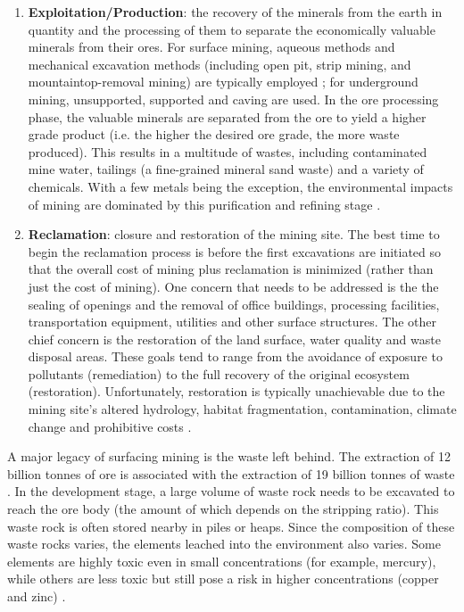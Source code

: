 \documentclass{article}
\begin{document}
\begin{enumerate}
    \item \textbf{Exploitation/Production}: the recovery of the minerals from the earth in quantity and the processing of them to separate the economically valuable minerals from their ores. For surface mining, aqueous methods and mechanical excavation methods (including open pit, strip mining, and mountaintop-removal mining) are typically employed \cite{lima2016legacy}; for underground mining, unsupported, supported and caving are used. In the ore processing phase, the valuable minerals are separated from the ore to yield a higher grade product (i.e. the higher the desired ore grade, the more waste produced). This results in a multitude of wastes, including contaminated mine water, tailings (a fine-grained mineral sand waste) and a variety of chemicals. With a few metals being the exception, the environmental impacts of mining are dominated by this purification and refining stage \cite{nuss2014life}.
    
    \item \textbf{Reclamation}: closure and restoration of the mining site. The best time to begin the reclamation process is before the first excavations are initiated so that the overall cost of mining plus reclamation is minimized (rather than just the cost of mining). One concern that needs to be addressed is the the sealing of openings and the removal of office buildings, processing facilities, transportation equipment, utilities and other surface structures. The other chief concern is the restoration of the land surface, water quality and waste disposal areas. These goals tend to range from the avoidance of exposure to pollutants (remediation) to the full recovery of the original ecosystem (restoration). Unfortunately, restoration is typically unachievable due to the mining site's altered hydrology, habitat fragmentation, contamination, climate change and prohibitive costs \cite{lima2016legacy}.
\end{enumerate}


A major legacy of surfacing mining is the waste left behind. The extraction of 12 billion tonnes of ore is associated with the extraction of 19 billion tonnes of waste \cite{copco2007mining}. In the development stage, a large volume of waste rock needs to be excavated to reach the ore body (the amount of which depends on the stripping ratio). This waste rock is often stored nearby in piles or heaps. Since the composition of these waste rocks varies, the elements leached into the environment also varies. Some elements are highly toxic even in small concentrations (for example, mercury), while others are less toxic but still pose a risk in higher concentrations (copper and zinc) \cite{geointro}.
\end{document}
